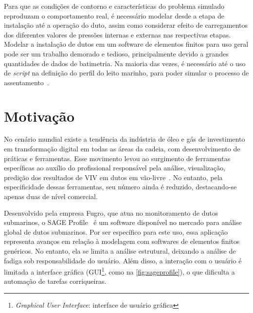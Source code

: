 Para que as condições de contorno e características do problema simulado reproduzam o comportamento real, é necessário modelar desde a etapa de instalação até a operação do duto, assim como considerar efeito de carregamentos dos diferentes valores de pressões internas e externas nas respectivas etapas.
Modelar a instalação de dutos em um software de elementos finitos para uso geral pode ser um trabalho demorado e tedioso, principalmente devido a grandes quantidades de dados de batimetria.
Na maioria das vezes, é necessário até o uso de \textit{script} na definição do perfil do leito marinho, para poder simular o processo de assentamento~\cite{VandenAbeele2013}.





\section{Motivação}


No cenário mundial existe a tendência da indústria de óleo e gás de investimento em transformação digital em todas as áreas da cadeia, com desenvolvimento de práticas e ferramentas. Esse movimento levou ao surgimento de ferramentas específicas ao auxílio do profissional responsável pela análise, visualização, predição dos resultados de VIV em dutos em vão-livre~\cite{Mittal2017}. No entanto, pela especificidade dessas ferramentas, seu número ainda é reduzido, destacando-se apenas duas de nível comercial.




Desenvolvido pela empresa Fugro, que atua no monitoramento de dutos submarinos, o SAGE Profile~\cite{sageprofile} é um software disponível no mercado para análise global de dutos submarinos.
Por ser específico para este uso, essa aplicação representa avanços em relação à modelagem com softwares de elementos finitos genéricos.
No entanto, ela se limita a análise estrutural, deixando a análise de fadiga sob responsabilidade do usuário.
Além disso, a interação com o usuário é limitada a interface gráfica (GUI\footnote{\textit{Graphical User Interface}: interface de usuário gráfica}, como na \autoref{fig:sageprofile}), o que dificulta a automação de tarefas corriqueiras.

